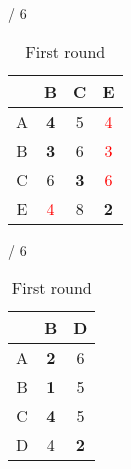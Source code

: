 \documentclass[a4paper, 11 pt, article, accentcolor=tud7b]{tudreport}
\begin{document}
\begin{table}[h]
\begin{subtable}[b]{\textwidth / 6}
	    \begin{tabular}{| c | c | c | c |}
	    \hline
	      & B                   & C           & E           \\ \hline
	    A & \textbf{4}          & 5           & \textcolor{red}{4} \\ \hline
	    B & \textbf{3}          & 6           & \textcolor{red}{3} \\ \hline
	    C & 6                   & \textbf{3}  & \textcolor{red}{6} \\ \hline
	    E & \textcolor{red}{4}  & 8           & \textbf{2}  \\ \hline
	    \end{tabular}
	    \caption{$D^{D}$}
	  \end{subtable}
	  \hfill
	  \begin{subtable}[b]{\textwidth / 6}
	    \begin{tabular}{| c | c | c |}
	    \hline
	      & B          & D           \\ \hline
	    A & \textbf{2} & 6           \\ \hline
	    B & \textbf{1} & 5           \\ \hline
	    C & \textbf{4} & 5           \\ \hline
	    D & 4          & \textbf{2}  \\ \hline
	    \end{tabular}
	    \caption{$D^{E}$}
	  \end{subtable}
	  \caption{First round}
	\end{table}
	
\end{document}
